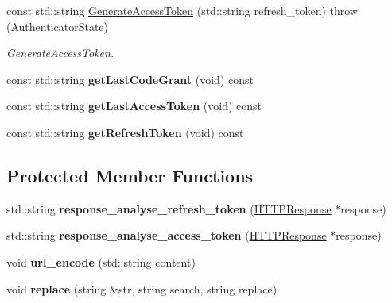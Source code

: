 \begin{DoxyCompactItemize}
const std\+::string \hyperlink{classAVSAuthenticator_a501ad6b1063945e065ed00d5f25e7dd8}{Generate\+Access\+Token} (std\+::string refresh\+\_\+token)  throw (\+Authenticator\+State)
\begin{DoxyCompactList}\small\item\em Generate\+Access\+Token. \end{DoxyCompactList}\item 
\mbox{\label{classAVSAuthenticator_a36556663a3cddcea619c4990a6f1b3ef}} 
const std\+::string {\bfseries get\+Last\+Code\+Grant} (void) const
\item 
\mbox{\label{classAVSAuthenticator_a5e81f4f68736463f984b86636d7aad46}} 
const std\+::string {\bfseries get\+Last\+Access\+Token} (void) const
\item 
\mbox{\label{classAVSAuthenticator_a3b15ba2b326d91dd4e416f040eb31e6e}} 
const std\+::string {\bfseries get\+Refresh\+Token} (void) const
\end{DoxyCompactItemize}
\subsection*{Protected Member Functions}
\begin{DoxyCompactItemize}
\item 
\mbox{\label{classAVSAuthenticator_a16f585dde9b8f3a57f63a2a2efdb6bb3}} 
std\+::string {\bfseries response\+\_\+analyse\+\_\+refresh\+\_\+token} (\hyperlink{classNetwork_1_1HTTP_1_1HTTPResponse}{H\+T\+T\+P\+Response} $\ast$response)
\item 
\mbox{\label{classAVSAuthenticator_a10b289223c265cf3d5e42eef181839ea}} 
std\+::string {\bfseries response\+\_\+analyse\+\_\+access\+\_\+token} (\hyperlink{classNetwork_1_1HTTP_1_1HTTPResponse}{H\+T\+T\+P\+Response} $\ast$response)
\item 
\mbox{\label{classAVSAuthenticator_ab886240a85b2c530286e976af9a62a9c}} 
void {\bfseries url\+\_\+encode} (std\+::string content)
\item 
\mbox{\label{classAVSAuthenticator_ae88efd94941043ac454a2587031ab74e}} 
void {\bfseries replace} (string \&str, string search, string replace)
\end{DoxyCompactItemize}


